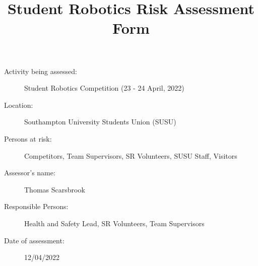 \documentclass[12pt,a4paper]{scrartcl}
\title{Student Robotics Risk Assessment Form}
\begin{document}
\maketitle

\begin{description}
\item[Activity being assessed:] Student Robotics Competition (23 - 24 April, 2022)
\item[Location:] Southampton University Students Union (SUSU)
\item[Persons at risk:] Competitors, Team Supervisors, SR Volunteers, SUSU Staff, Visitors
\end{description}

\begin{description}
\item[Assessor's name:] Thomas Scarsbrook
\item[Responsible Persons:] Health and Safety Lead, SR Volunteers, Team Supervisors
\item[Date of assessment:] 12/04/2022
\end{description}
\clearpage

\renewcommand{\cellalign}{tl}
\renewcommand{\theadalign}{tl}

\newcommand{\risk}[4]{
	#1 & #2 & #3 & #4 \\
}
\end{document}
